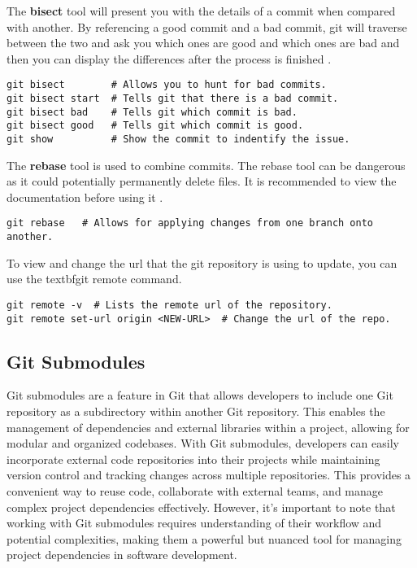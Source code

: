 The \textbf{bisect} tool will present you with the details of a commit when compared with another. By referencing a good commit and a bad commit, git will traverse between the two and ask you which ones are good and which ones are bad and then you can display the differences after the process is finished \cite{git}\cite{git: Advanced}.
\begin{lstlisting}
git bisect        # Allows you to hunt for bad commits.
git bisect start  # Tells git that there is a bad commit.
git bisect bad    # Tells git which commit is bad.
git bisect good   # Tells git which commit is good.
git show          # Show the commit to indentify the issue.
\end{lstlisting}

The \textbf{rebase} tool is used to combine commits. The rebase tool can be dangerous as it could potentially permanently delete files. It is recommended to view the documentation before using it \cite{git}\cite{git: Advanced}.
\begin{lstlisting}
git rebase   # Allows for applying changes from one branch onto another.
\end{lstlisting}

To view and change the url that the git repository is using to update, you can use the 
textbf{git remote} command.
\begin{lstlisting}
git remote -v  # Lists the remote url of the repository.
git remote set-url origin <NEW-URL>  # Change the url of the repo.
\end{lstlisting}












\subsection{Git Submodules}

Git submodules are a feature in Git that allows developers to include one Git repository as a subdirectory within another Git repository. This enables the management of dependencies and external libraries within a project, allowing for modular and organized codebases. With Git submodules, developers can easily incorporate external code repositories into their projects while maintaining version control and tracking changes across multiple repositories. This provides a convenient way to reuse code, collaborate with external teams, and manage complex project dependencies effectively. However, it's important to note that working with Git submodules requires understanding of their workflow and potential complexities, making them a powerful but nuanced tool for managing project dependencies in software development.

